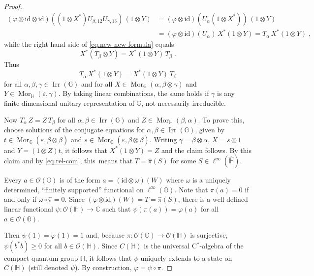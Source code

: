 \documentclass[12pt]{amsart}
\theoremstyle{remark}
\theoremstyle{remark}
\begin{document}
\begin{proof}
\begin{align*}
(\varphi \otimes \mathrm{id} \otimes \mathrm{id})((1 \otimes X^*) U_{\beta,12} U_{\gamma,13}) \, (1 \otimes Y) &= (\varphi \otimes \mathrm{id})(U_\alpha (1 \otimes X^*)) \, (1 \otimes Y) \\ &= (\varphi \otimes \mathrm{id})(U_\alpha) \, X^* (1 \otimes Y) = T_\alpha \, X^* (1 \otimes Y) \; ,
\end{align*}
while the right hand side of \eqref{eq.new-new-formula} equals
$$X^* (T_\beta \otimes Y) = X^* (1 \otimes Y) \, T_\beta \; .$$
Thus
$$T_\alpha \, X^*(1 \otimes Y) = X^*(1 \otimes Y) \, T_\beta$$
for all $\alpha,\beta,\gamma \in \operatorname{Irr}(\mathbb{G})$ and for all $X \in \operatorname{Mor}_\mathbb{G}(\alpha,\beta \otimes \gamma)$ and $Y \in \operatorname{Mor}_\mathbb{H}(\varepsilon,\gamma)$. By taking linear combinations, the same holds if $\gamma$ is any finite dimensional unitary representation of $\mathbb{G}$, not necessarily irreducible.

\bigskip


Now $T_\alpha \, Z = Z \, T_\beta$ for all $\alpha,\beta \in \operatorname{Irr}(\mathbb{G})$ and $Z \in \operatorname{Mor}_\mathbb{H}(\beta,\alpha)$. To prove this, choose solutions of the conjugate equations for $\alpha,\beta \in \operatorname{Irr}(\mathbb{G})$, given by $t \in \operatorname{Mor}_\mathbb{G}(\varepsilon,\overline{\beta} \otimes \beta)$ and $s \in \operatorname{Mor}_\mathbb{G}(\varepsilon,\beta \otimes \overline{\beta})$. Writing $\gamma = \overline{\beta} \otimes \alpha$, $X = s \otimes 1$ and $Y = (1 \otimes Z)t$, it follows that $X^*(1 \otimes Y) = Z$ and the claim follows. By this claim and by \eqref{eq.rel-com}, this\ means that $T = \widehat{\pi}(S)$ for some $S \in \ell^\infty(\widehat{\mathbb{H}})$.

\bigskip

Every $a \in \mathcal{O}(\mathbb{G})$ is of the form $a = (\mathrm{id} \otimes \omega)(W)$ where $\omega$ is a uniquely determined, ``finitely supported'' functional on $\ell^\infty(\mathbb{G})$. Note that $\pi(a) = 0$ if and only if $\omega \circ \widehat{\pi} = 0$. Since $(\varphi \otimes \mathrm{id})(W) = T = \widehat{\pi}(S)$,  there is a well defined linear functional $\psi : \mathcal{O}(\mathbb{H}) \to \mathbb{C}$ such that $\psi(\pi(a)) = \varphi(a)$ for all $a \in \mathcal{O}(\mathbb{G})$.

\bigskip

Then $\psi(1) = \varphi(1) = 1$ and, because $\pi : \mathcal{O}(\mathbb{G}) \to \mathcal{O}(\mathbb{H})$ is surjective, $\psi(b^* b) \geq 0$ for all $b \in \mathcal{O}(\mathbb{H})$. Since $C(\mathbb{H})$ is the universal C$^*$-algebra of the compact quantum group $\mathbb{H}$, it follows that $\psi$ uniquely extends to a state on $C(\mathbb{H})$ (still denoted $\psi$). By construction, $\varphi = \psi \circ \pi$.
\end{proof}
\end{document}
